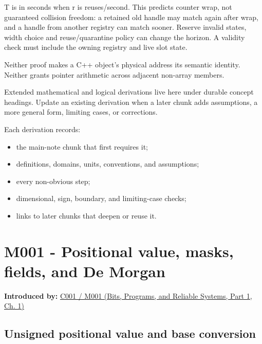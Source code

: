 T is in seconds when r is reuses/second. This predicts counter wrap, not guaranteed collision freedom: a retained old handle may match again after wrap, and a handle from another registry can match sooner. Reserve invalid states, width choice and reuse/quarantine policy can change the horizon. A validity check must include the owning registry and live slot state.

Neither proof makes a C++ object's physical address its semantic identity. Neither grants pointer arithmetic across adjacent non-array members.

Extended mathematical and logical derivations live here under durable concept headings. Update an existing derivation when a later chunk adds assumptions, a more general form, limiting cases, or corrections.

Each derivation records:

\begin{itemize}
\tightlist
\item
  the main-note chunk that first requires it;
\item
  definitions, domains, units, conventions, and assumptions;
\item
  every non-obvious step;
\item
  dimensional, sign, boundary, and limiting-case checks;
\item
  links to later chunks that deepen or reuse it.
\end{itemize}

\section{M001 - Positional value, masks, fields, and De Morgan}\label{03-visual-computing-i-ch018-m001---positional-value-masks-fields-and-de-morgan}

\hypertarget{03-visual-computing-i-ch018-m001---positional-value-masks-fields-and-de-morgan}{}

\textbf{Introduced by:} \href{../01-Bits-Programs-and-Reliable-Systems-P01/main.pdf\#nameddest=01-foundations-i-ch001-from-a-signal-to-an-interpretation}{C001 / M001 (Bits, Programs, and Reliable Systems, Part 1, Ch. 1)}

\subsection{Unsigned positional value and base conversion}\label{03-visual-computing-i-ch018-unsigned-positional-value-and-base-conversion}

